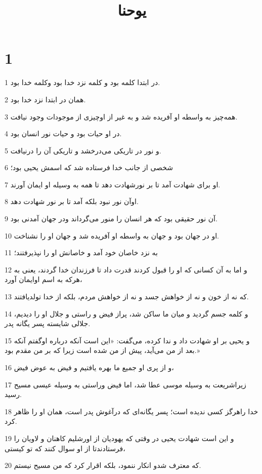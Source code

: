 

\title{يوحنا}


\chapter{1}

\par 1 در ابتدا کلمه بود و کلمه نزد خدا بود وکلمه خدا بود.
\par 2 همان در ابتدا نزد خدا بود.
\par 3 همه‌چیز به واسطه او آفریده شد و به غیر از اوچیزی از موجودات وجود نیافت.
\par 4 در او حیات بود و حیات نور انسان بود.
\par 5 و نور در تاریکی می‌درخشد و تاریکی آن را درنیافت.
\par 6 شخصی از جانب خدا فرستاده شد که اسمش یحیی بود؛
\par 7 او برای شهادت آمد تا بر نورشهادت دهد تا همه به وسیله او ایمان آورند.
\par 8 اوآن نور نبود بلکه آمد تا بر نور شهادت دهد.
\par 9 آن نور حقیقی بود که هر انسان را منور می‌گرداند ودر جهان آمدنی بود.
\par 10 او در جهان بود و جهان به واسطه او آفریده شد و جهان او را نشناخت.
\par 11 به نزد خاصان خود آمد و خاصانش او را نپذیرفتند؛
\par 12 و اما به آن کسانی که او را قبول کردند قدرت داد تا فرزندان خدا گردند، یعنی به هر‌که به اسم اوایمان آورد،
\par 13 که نه از خون و نه از خواهش جسد و نه از خواهش مردم، بلکه از خدا تولدیافتند.
\par 14 و کلمه جسم گردید و میان ما ساکن شد، پراز فیض و راستی و جلال او را دیدیم، جلالی شایسته پسر یگانه پدر.
\par 15 و یحیی بر او شهادت داد و ندا کرده، می‌گفت: «این است آنکه درباره اوگفتم آنکه بعد از من می‌آید، پیش از من شده است زیرا که بر من مقدم بود.»
\par 16 و از پری او جمیع ما بهره یافتیم و فیض به عوض فیض،
\par 17 زیراشریعت به وسیله موسی عطا شد، اما فیض وراستی به وسیله عیسی مسیح رسید.
\par 18 خدا راهرگز کسی ندیده است؛ پسر یگانه‌ای که درآغوش پدر است، همان او را ظاهر کرد.
\par 19 و این است شهادت یحیی در وقتی که یهودیان از اورشلیم کاهنان و لاویان را فرستادندتا از او سوال کنند که تو کیستی،
\par 20 که معترف شدو انکار ننمود، بلکه اقرار کرد که من مسیح نیستم.
